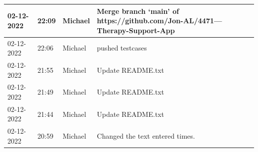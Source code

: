 \documentclass[11pt]{article}
\begin{document}
\begin{center}
\begin{longtable}{|p{2cm}|l|p{2cm}|p{10.5cm}|}
            02-12-2022                                 & 22:09                              & Michael                                 & Merge branch `main' of https://github.com/Jon-AL/4471---Therapy-Support-App                                                                                                                                                                                                                                  \\ \hline
            02-12-2022                                 & 22:06                              & Michael                                 & pushed testcases                                                                                                                                                                                                                                                                                             \\ \hline
            02-12-2022                                 & 21:55                              & Michael                                 & Update README.txt                                                                                                                                                                                                                                                                                            \\ \hline
            02-12-2022                                 & 21:49                              & Michael                                 & Update README.txt                                                                                                                                                                                                                                                                                            \\ \hline
            02-12-2022                                 & 21:44                              & Michael                                 & Update README.txt                                                                                                                                                                                                                                                                                            \\ \hline
            02-12-2022                                 & 20:59                              & Michael                                 & Changed the text entered times.                                                                                                                                                                                                                                                                              \\ \hline

\end{longtable}
\end{center}
\end{document}
